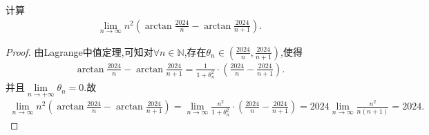\documentclass[../../main.tex]{subfiles}%
\begin{document}
\begin{example}
计算
\begin{align*}
\lim_{n \to \infty} n^2 \left(\arctan\frac{2024}{n} - \arctan\frac{2024}{n + 1}\right).
\end{align*}
\end{example}
\begin{proof}
由Lagrange中值定理,可知对$\forall n\in\mathbb{N}$,存在$\theta_n\in(\frac{2024}{n},\frac{2024}{n + 1})$,使得
\begin{align*}
\arctan\frac{2024}{n} - \arctan\frac{2024}{n + 1} = \frac{1}{1+\theta _{n}^{2}}\cdot \left( \frac{2024}{n}-\frac{2024}{n+1} \right).
\end{align*}
并且$\underset{n\rightarrow +\infty}{\lim}\theta _n=0$.故
\begin{align*}
\lim_{n\rightarrow \infty} n^2\left( \arctan \frac{2024}{n}-\arctan \frac{2024}{n+1} \right) =\lim_{n\rightarrow \infty} \frac{n^2}{1+\theta _{n}^{2}}\cdot \left( \frac{2024}{n}-\frac{2024}{n+1} \right) =2024\lim_{n\rightarrow \infty} \frac{n^2}{n\left( n+1 \right)}=2024.
\end{align*}
\end{proof}
\end{document}
